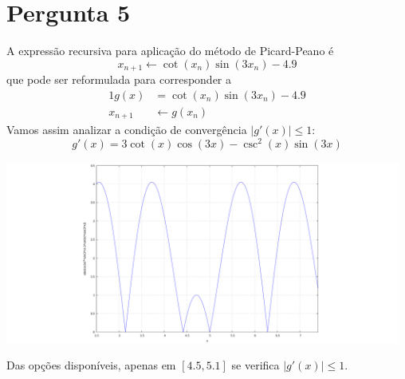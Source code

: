 \section{Pergunta 5}
A expressão recursiva para aplicação do método de Picard-Peano é
\begin{equation*}
	x_{n+1} \leftarrow \cot(x_n)\sin(3x_n)-4.9
\end{equation*}
que pode ser reformulada para corresponder a
\begin{alignat*}{1}
	g(x) &= \cot(x_n)\sin(3x_n)-4.9\\
	x_{n+1}&\leftarrow g(x_n)
\end{alignat*}
Vamos assim analizar a condição de convergência $|g'(x)| \leq 1$:
\begin{equation*}
	g'(x)=3\cot(x)\cos(3x)-\csc^2(x)\sin(3x)
\end{equation*}
\begin{center} \includegraphics[height=60mm,keepaspectratio]{plotDESC1T1-5} \end{center}
Das opções disponíveis, apenas em $[4.5,5.1]$ se verifica $|g'(x)|\leq 1$.